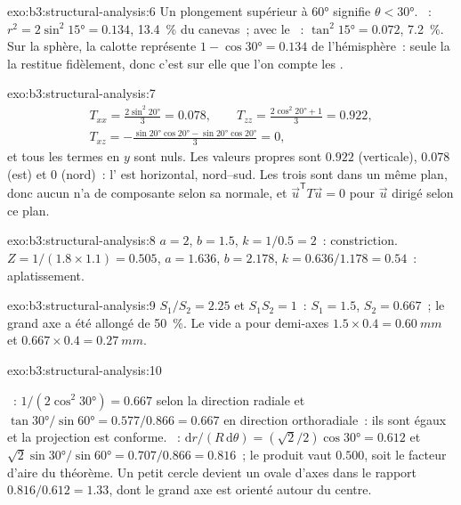 \begin{solution}{exo:b3:structural-analysis:6}
Un plongement supérieur à \ang{60} signifie $\theta < \ang{30}$. ~: $r^2 =
2\sin^2\ang{15} = 0.134$, \qty{13.4}{\percent} du canevas~; avec le ~:
$\tan^2\ang{15} = 0.072$, \qty{7.2}{\percent}. Sur la sphère, la calotte représente
$1 - \cos\ang{30} = 0.134$ de l'hémisphère~: seule la 
la restitue fidèlement, donc c'est sur elle que l'on compte les .
\end{solution}

\begin{solution}{exo:b3:structural-analysis:7}
\begin{gather*}
  T_{xx} = \frac{2\sin^2\ang{20}}3 = 0.078,\qquad
  T_{zz} = \frac{2\cos^2\ang{20} + 1}3 = 0.922,\\
  T_{xz} = -\frac{\sin\ang{20}\cos\ang{20} - \sin\ang{20}\cos\ang{20}}3 = 0,
\end{gather*}
et tous les termes en $y$ sont nuls. Les valeurs propres sont $0.922$ (verticale),
$0.078$ (est) et $0$ (nord)~: l' est horizontal, nord--sud.
Les trois  sont dans un même plan, donc aucun n'a de composante selon sa normale,
et $\vec u^{\mathsf T}T\vec u = 0$ pour $\vec u$ dirigé selon ce plan.
\end{solution}

\begin{solution}{exo:b3:structural-analysis:8}
$a = 2$, $b = 1.5$, $k = 1/0.5 = 2$~: constriction. $Z = 1/(1.8\times1.1) =
0.505$, $a = 1.636$, $b = 2.178$, $k = 0.636/1.178 = 0.54$~: aplatissement.
\end{solution}

\begin{solution}{exo:b3:structural-analysis:9}
$S_1/S_2 = 2.25$ et $S_1S_2 = 1$~: $S_1 = 1.5$, $S_2 = 0.667$~; le grand axe
a été allongé de \qty{50}{\percent}. Le vide a pour demi-axes $1.5\times0.4 =
\qty{0.60}{mm}$ et $0.667\times0.4 = \qty{0.27}{mm}$.
\end{solution}

\begin{solution}{exo:b3:structural-analysis:10}
{\sloppy
{}~: $1/(2\cos^2\ang{30}) = 0.667$ selon la direction radiale et
$\tan\ang{30}/\sin\ang{60} = 0.577/0.866 = 0.667$ en direction orthoradiale~: ils sont égaux et la projection est conforme.
~: $\mathrm dr/(R\,\mathrm d\theta) = (\sqrt2/2)\cos\ang{30} = 0.612$
et $\sqrt2\sin\ang{30}/\sin\ang{60} = 0.707/0.866 = 0.816$~; le produit vaut
$0.500$, soit le facteur d'aire du théorème. Un petit cercle devient un ovale d'axes
dans le rapport $0.816/0.612 = 1.33$, dont le grand axe est orienté autour du centre.\par}
\end{solution}


